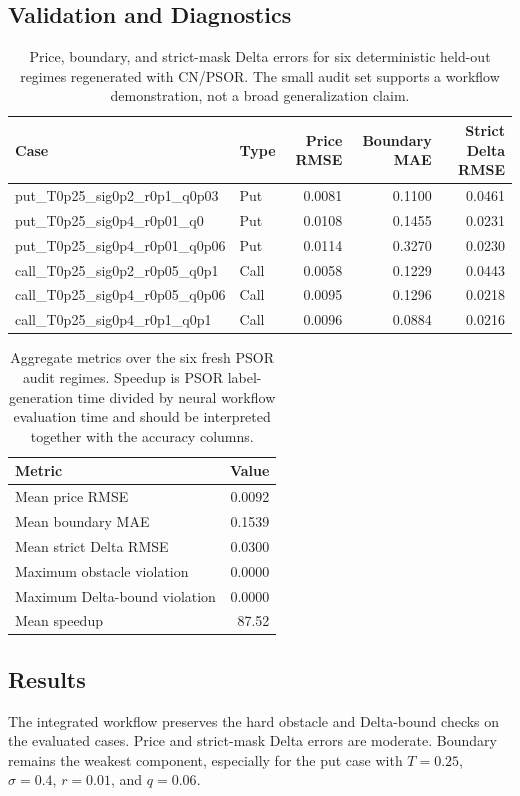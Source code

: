 \documentclass[11pt]{article}
\begin{document}
\subsection{Validation and Diagnostics}
\begin{table}[h]
\centering
\begin{tabular}{llrrr}
\toprule
Case & Type & Price RMSE & Boundary MAE & Strict Delta RMSE\\
\midrule
put\_T0p25\_sig0p2\_r0p1\_q0p03 & Put & 0.0081 & 0.1100 & 0.0461\\
put\_T0p25\_sig0p4\_r0p01\_q0 & Put & 0.0108 & 0.1455 & 0.0231\\
put\_T0p25\_sig0p4\_r0p01\_q0p06 & Put & 0.0114 & 0.3270 & 0.0230\\
call\_T0p25\_sig0p2\_r0p05\_q0p1 & Call & 0.0058 & 0.1229 & 0.0443\\
call\_T0p25\_sig0p4\_r0p05\_q0p06 & Call & 0.0095 & 0.1296 & 0.0218\\
call\_T0p25\_sig0p4\_r0p1\_q0p1 & Call & 0.0096 & 0.0884 & 0.0216\\
\bottomrule
\end{tabular}
\caption{Price, boundary, and strict-mask Delta errors for six deterministic held-out regimes regenerated with CN/PSOR. The small audit set supports a workflow demonstration, not a broad generalization claim.}
\end{table}

\begin{table}[h]
\centering
\begin{tabular}{lr}
\toprule
Metric & Value\\
\midrule
Mean price RMSE & 0.0092\\
Mean boundary MAE & 0.1539\\
Mean strict Delta RMSE & 0.0300\\
Maximum obstacle violation & 0.0000\\
Maximum Delta-bound violation & 0.0000\\
Mean speedup & 87.52\\
\bottomrule
\end{tabular}
\caption{Aggregate metrics over the six fresh PSOR audit regimes. Speedup is PSOR label-generation time divided by neural workflow evaluation time and should be interpreted together with the accuracy columns.}
\end{table}

\subsection{Results}
The integrated workflow preserves the hard obstacle and Delta-bound checks on the evaluated cases. Price and strict-mask Delta errors are moderate. Boundary remains the weakest component, especially for the put case with $T=0.25$, $\sigma=0.4$, $r=0.01$, and $q=0.06$.
\end{document}

